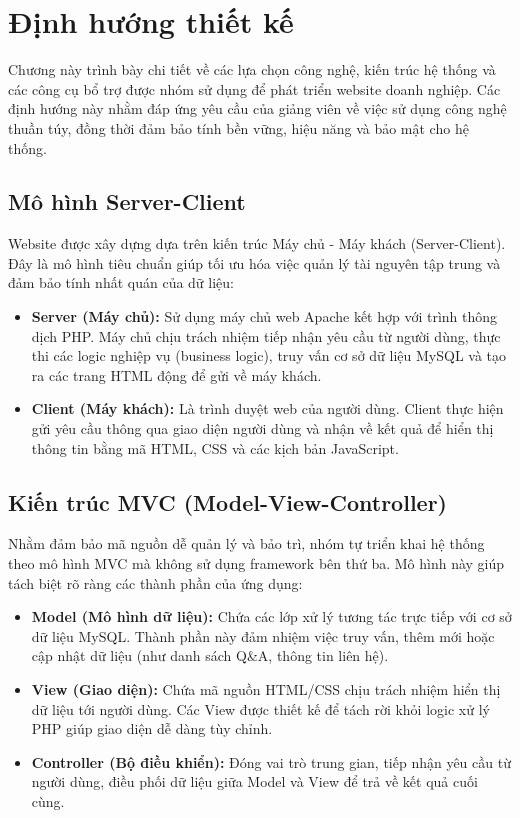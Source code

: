\section{Định hướng thiết kế}

Chương này trình bày chi tiết về các lựa chọn công nghệ, kiến trúc hệ thống và các công cụ bổ trợ được nhóm sử dụng để phát triển website doanh nghiệp. Các định hướng này nhằm đáp ứng yêu cầu của giảng viên về việc sử dụng công nghệ thuần túy, đồng thời đảm bảo tính bền vững, hiệu năng và bảo mật cho hệ thống.

\subsection{Mô hình Server-Client}
Website được xây dựng dựa trên kiến trúc Máy chủ - Máy khách (Server-Client). Đây là mô hình tiêu chuẩn giúp tối ưu hóa việc quản lý tài nguyên tập trung và đảm bảo tính nhất quán của dữ liệu:
\begin{itemize}
    \item \textbf{Server (Máy chủ):} Sử dụng máy chủ web Apache kết hợp với trình thông dịch PHP. Máy chủ chịu trách nhiệm tiếp nhận yêu cầu từ người dùng, thực thi các logic nghiệp vụ (business logic), truy vấn cơ sở dữ liệu MySQL và tạo ra các trang HTML động để gửi về máy khách.
    \item \textbf{Client (Máy khách):} Là trình duyệt web của người dùng. Client thực hiện gửi yêu cầu thông qua giao diện người dùng và nhận về kết quả để hiển thị thông tin bằng mã HTML, CSS và các kịch bản JavaScript.
\end{itemize}

\subsection{Kiến trúc MVC (Model-View-Controller)}
Nhằm đảm bảo mã nguồn dễ quản lý và bảo trì, nhóm tự triển khai hệ thống theo mô hình MVC mà không sử dụng framework bên thứ ba. Mô hình này giúp tách biệt rõ ràng các thành phần của ứng dụng:
\begin{itemize}
    \item \textbf{Model (Mô hình dữ liệu):} Chứa các lớp xử lý tương tác trực tiếp với cơ sở dữ liệu MySQL. Thành phần này đảm nhiệm việc truy vấn, thêm mới hoặc cập nhật dữ liệu (như danh sách Q\&A, thông tin liên hệ).
    \item \textbf{View (Giao diện):} Chứa mã nguồn HTML/CSS chịu trách nhiệm hiển thị dữ liệu tới người dùng. Các View được thiết kế để tách rời khỏi logic xử lý PHP giúp giao diện dễ dàng tùy chỉnh.
    \item \textbf{Controller (Bộ điều khiển):} Đóng vai trò trung gian, tiếp nhận yêu cầu từ người dùng, điều phối dữ liệu giữa Model và View để trả về kết quả cuối cùng.
\end{itemize}

